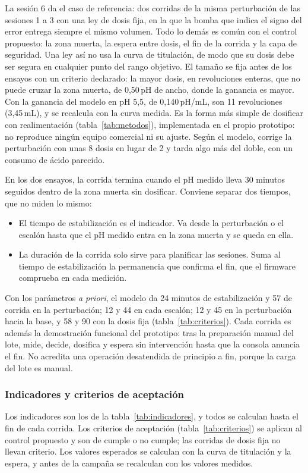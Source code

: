 La sesión 6 da el caso de referencia: dos corridas de la misma perturbación de las sesiones 1 a 3 con una ley de dosis fija, en la que la bomba que indica el signo del error entrega siempre el mismo volumen. Todo lo demás es común con el control propuesto: la zona muerta, la espera entre dosis, el fin de la corrida y la capa de seguridad. Una ley así no usa la curva de titulación, de modo que su dosis debe ser segura en cualquier punto del rango objetivo. El tamaño se fija antes de los ensayos con un criterio declarado: la mayor dosis, en revoluciones enteras, que no puede cruzar la zona muerta, de 0,50\,pH de ancho, donde la ganancia es mayor. Con la ganancia del modelo en pH 5,5, de 0,140\,pH/mL, son 11 revoluciones (3,45\,mL), y se recalcula con la curva medida. Es la forma más simple de dosificar con realimentación (tabla~\ref{tab:metodos}), implementada en el propio prototipo: no reproduce ningún equipo comercial ni su ajuste. Según el modelo, corrige la perturbación con unas 8 dosis en lugar de 2 y tarda algo más del doble, con un consumo de ácido parecido.

En los dos ensayos, la corrida termina cuando el pH medido lleva 30 minutos seguidos dentro de la zona muerta sin dosificar. Conviene separar dos tiempos, que no miden lo mismo:
\begin{itemize}
\item El tiempo de estabilización es el indicador. Va desde la perturbación o el escalón hasta que el pH medido entra en la zona muerta y se queda en ella.
\item La duración de la corrida solo sirve para planificar las sesiones. Suma al tiempo de estabilización la permanencia que confirma el fin, que el firmware comprueba en cada medición.
\end{itemize}
Con los parámetros \emph{a priori}, el modelo da 24 minutos de estabilización y 57 de corrida en la perturbación; 12 y 44 en cada escalón; 12 y 45 en la perturbación hacia la base, y 58 y 90 con la dosis fija (tabla~\ref{tab:criterios}). Cada corrida es además la demostración funcional del prototipo: tras la preparación manual del lote, mide, decide, dosifica y espera sin intervención hasta que la consola anuncia el fin. No acredita una operación desatendida de principio a fin, porque la carga del lote es manual.

\subsubsection{Indicadores y criterios de aceptación}\label{sec:criterios}
Los indicadores son los de la tabla~\ref{tab:indicadores}, y todos se calculan hasta el fin de cada corrida. Los criterios de aceptación (tabla~\ref{tab:criterios}) se aplican al control propuesto y son de cumple o no cumple; las corridas de dosis fija no llevan criterio. Los valores esperados se calculan con la curva de titulación y la espera, y antes de la campaña se recalculan con los valores medidos.

